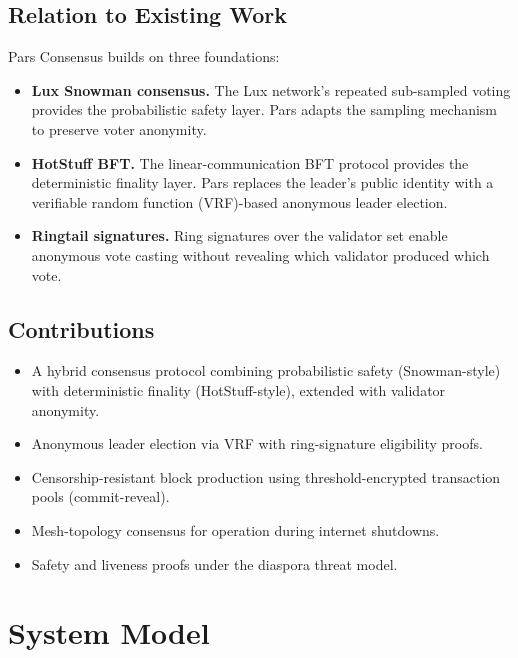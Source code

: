 \documentclass[11pt,a4paper]{article}
\begin{document}
\subsection{Relation to Existing Work}

Pars Consensus builds on three foundations:

\begin{itemize}
    \item \textbf{Lux Snowman consensus.}  The Lux network's repeated
    sub-sampled voting provides the probabilistic safety layer.  Pars
    adapts the sampling mechanism to preserve voter anonymity.
    \item \textbf{HotStuff BFT.}  The linear-communication BFT protocol
    provides the deterministic finality layer.  Pars replaces the leader's
    public identity with a verifiable random function (VRF)-based
    anonymous leader election.
    \item \textbf{Ringtail signatures.}  Ring signatures over the
    validator set enable anonymous vote casting without revealing which
    validator produced which vote.
\end{itemize}

\subsection{Contributions}

\begin{itemize}
    \item A hybrid consensus protocol combining probabilistic safety
    (Snowman-style) with deterministic finality (HotStuff-style),
    extended with validator anonymity.
    \item Anonymous leader election via VRF with ring-signature
    eligibility proofs.
    \item Censorship-resistant block production using threshold-encrypted
    transaction pools (commit-reveal).
    \item Mesh-topology consensus for operation during internet shutdowns.
    \item Safety and liveness proofs under the diaspora threat model.
\end{itemize}

\section{System Model}
\label{sec:model}
\end{document}
